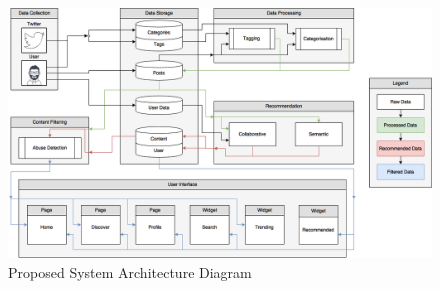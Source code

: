 \begin{figure}[H]
  \centering
  \includegraphics[width=1.0\textwidth]{Images/Design/SystemArchitecture}
  \caption{Proposed System Architecture Diagram} \label{fig:SystemArchitecture} 
\end{figure}
